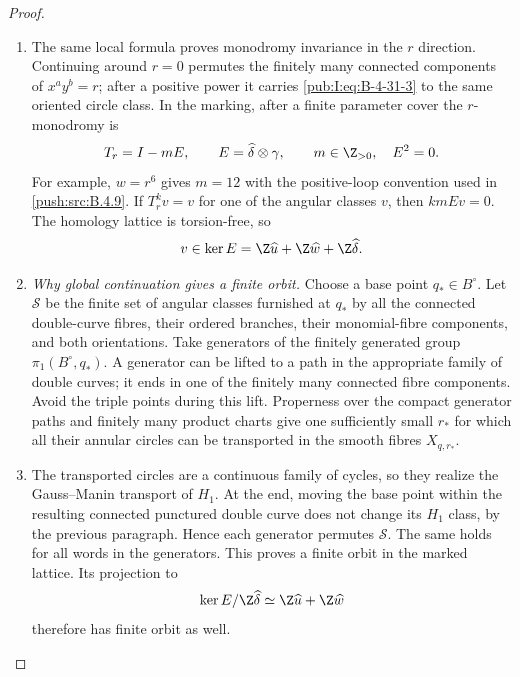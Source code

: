 \begin{proof}
\begin{enumerate}[label=\arabic*.,leftmargin=*]
\item The same local formula proves monodromy invariance in the
$r$ direction. Continuing around $r=0$ permutes the finitely
many connected components of $x^a y^b=r$; after a positive
power it carries \eqref{pub:I:eq:B-4-31-3} to the same oriented circle class.
In the marking, after a finite parameter cover the
$r$-monodromy is
\begin{equation}
 T_r=I-mE,\qquad
 E=\widehat\delta\otimes\gamma,\qquad m\in\Z_{>0},
 \quad E^2=0.
\label{pub:I:eq:B-4-31-4}
\end{equation}
For example, $w=r^6$ gives $m=12$ with the positive-loop
convention used in \ref{push:src:B.4.9}. If $T_r^k v=v$ for one of the
angular classes $v$, then $kmEv=0$. The homology lattice is
torsion-free, so
\begin{equation}
 v\in\ker E
    =\Z\widehat u+\Z\widehat w+\Z\widehat\delta.
\label{pub:I:eq:B-4-31-5}
\end{equation}

\item \emph{Why global continuation gives a finite orbit.}
Choose a base point $q_*\in B^\circ$. Let $\mathscr S$ be the
finite set of angular classes furnished at $q_*$ by all the
connected double-curve fibres, their ordered branches, their
monomial-fibre components, and both orientations.
Take generators of the finitely generated group
$\pi_1(B^\circ,q_*)$. A generator can be lifted to a path in
the appropriate family of double curves; it ends in one of
the finitely many connected fibre components. Avoid the
triple points during this lift. Properness over the compact
generator paths and finitely many product charts give one
sufficiently small $r_*$ for which all their annular circles
can be transported in the smooth fibres
$X_{q,r_*}$.

\item The transported circles are a continuous family of cycles,
so they realize the Gauss--Manin transport of $H_1$.
At the end, moving the base point within the resulting
connected punctured double curve does not change its $H_1$
class, by the previous paragraph. Hence each generator
permutes $\mathscr S$. The same holds for all words in the
generators. This proves a finite orbit in the marked lattice.
Its projection to
\begin{equation}
 \ker E/\Z\widehat\delta
       \simeq \Z\widehat u+\Z\widehat w
\label{pub:I:eq:B-4-31-6}
\end{equation}
therefore has finite orbit as well.


\end{enumerate}
\end{proof}
